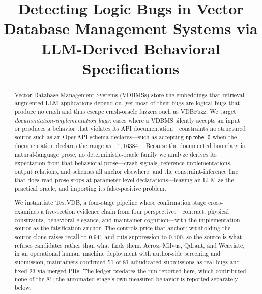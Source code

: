 \documentclass[acmsmall,screen,review,anonymous]{acmart}
\newcommand{\system}{TestVDB}
\begin{document}
\title{Detecting Logic Bugs in Vector Database Management Systems via LLM-Derived Behavioral Specifications}

\begin{abstract}
Vector Database Management Systems (VDBMSs) store the embeddings that retrieval-augmented LLM applications depend on, yet most of their bugs are logical bugs that produce no crash and thus escape crash-oracle fuzzers such as VDBFuzz. We target \emph{documentation-implementation bugs}: cases where a VDBMS silently accepts an input or produces a behavior that violates its API documentation---constraints no structured source such as an OpenAPI schema declares---such as accepting \texttt{nprobe=0} when the documentation declares the range as $[1, 16384]$. Because the documented boundary is natural-language prose, no deterministic-oracle family we analyze derives its expectation from that behavioral prose---crash signals, reference implementations, output relations, and schemas all anchor elsewhere, and the constraint-inference line that does read prose stops at parameter-level declarations---leaving an LLM as the practical oracle, and importing its false-positive problem.

We instantiate \system{}, a four-stage pipeline whose confirmation stage cross-examines a five-section evidence chain from four perspectives---contract, physical constraints, behavioral elegance, and maintainer cognition---with the implementation source as the falsification anchor. The controls price that anchor: withholding the source clone raises recall to 0.941 and cuts suppression to 0.400, so the source is what refuses candidates rather than what finds them. Across Milvus, Qdrant, and Weaviate, in an operational human--machine deployment with author-side screening and submission, maintainers confirmed 51 of 81 adjudicated submissions as real bugs and fixed 23 via merged PRs. The ledger predates the run reported here, which contributed none of the 81; the automated stage's own measured behavior is reported separately below.


\end{abstract}
\end{document}
